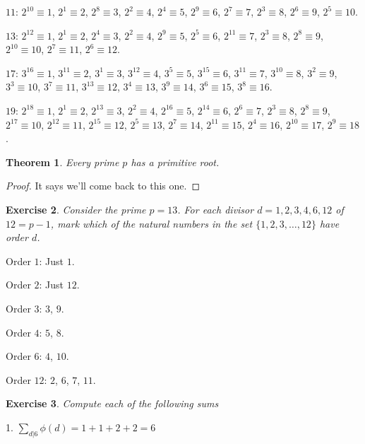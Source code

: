 \documentclass{article}
\newtheorem{thm}{Theorem}[section]
\newtheorem{ex}[thm]{Exercise}
\numberwithin{equation}{thm}
\begin{document}
$11$: $2^{10} \equiv 1$, $2^1 \equiv 2$, $2^8 \equiv 3$, $2^2 \equiv 4$, $2^4 \equiv 5$, $2^9 \equiv 6$, $2^7 \equiv 7$, $2^3 \equiv 8$,
$2^6 \equiv 9$, $2^5 \equiv 10$.

$13$: $2^{12} \equiv 1$, $2^1 \equiv 2$, $2^4 \equiv 3$, $2^2 \equiv 4$, $2^9 \equiv 5$, $2^5 \equiv 6$, $2^{11} \equiv 7$, $2^3 \equiv 8$,
$2^8 \equiv 9$, $2^{10} \equiv 10$, $2^7 \equiv 11$, $2^6 \equiv 12$.

$17$: $3^{16} \equiv 1$, $3^{11} \equiv 2$, $3^1 \equiv 3$, $3^{12} \equiv 4$, $3^5 \equiv 5$, $3^{15} \equiv 6$, $3^{11} \equiv 7$, $3^{10} \equiv 8$,
$3^2 \equiv 9$, $3^3 \equiv 10$, $3^7 \equiv 11$, $3^{13} \equiv 12$, $3^4 \equiv 13$, $3^9 \equiv 14$, $3^6 \equiv 15$, $3^8 \equiv 16$.

$19$: $2^{18} \equiv 1$, $2^1 \equiv 2$, $2^{13} \equiv 3$, $2^2 \equiv 4$, $2^{16} \equiv 5$, $2^{14} \equiv 6$, $2^6 \equiv 7$, $2^3 \equiv 8$,
$2^8 \equiv 9$, $2^{17} \equiv 10$, $2^{12} \equiv 11$, $2^{15} \equiv 12$, $2^5 \equiv 13$, $2^7 \equiv 14$, $2^{11} \equiv 15$, $2^4 \equiv 16$,
$2^{10} \equiv 17$, $2^9 \equiv 18$.



\begin{thm} \label{6.8}
  Every prime $p$ has a primitive root.
\end{thm}

\begin{proof}
  It says we'll come back to this one.
\end{proof}



\begin{ex} \label{6.9}
  Consider the prime $p = 13$. For each divisor $d = 1, 2, 3, 4, 6, 12$ of $12 = p-1$, mark which of the natural numbers in the set $\{1, 2, 3, \ldots, 12\}$ have order $d$.
\end{ex}

Order $1$: Just $1$.

Order $2$: Just $12$.

Order $3$: $3$, $9$.

Order $4$: $5$, $8$.

Order $6$: $4$, $10$.

Order $12$: $2$, $6$, $7$, $11$.



\begin{ex} \label{6.10}
  Compute each of the following sums
\end{ex}

1. $\sum_{d | 6} \phi(d) = 1 + 1 + 2 + 2 = 6$
\end{document}
